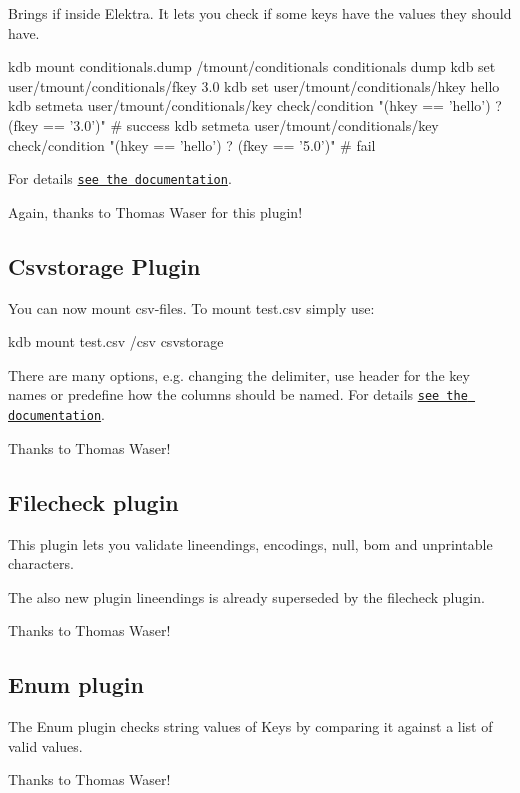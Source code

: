 Brings {\ttfamily if} inside Elektra. It lets you check if some keys have the values they should have. \begin{DoxyVerb}kdb mount conditionals.dump /tmount/conditionals conditionals dump
kdb set user/tmount/conditionals/fkey 3.0
kdb set user/tmount/conditionals/hkey hello
kdb setmeta user/tmount/conditionals/key check/condition "(hkey == 'hello') ? (fkey == '3.0')" # success
kdb setmeta user/tmount/conditionals/key check/condition "(hkey == 'hello') ? (fkey == '5.0')" # fail
\end{DoxyVerb}


For details \href{https://master.libelektra.org/src/plugins/conditionals/}{\tt see the documentation}.

Again, thanks to Thomas Waser for this plugin!

\subsection*{Csvstorage Plugin}

You can now mount csv-\/files. To mount {\ttfamily test.\+csv} simply use\+: \begin{DoxyVerb}kdb mount test.csv /csv csvstorage
\end{DoxyVerb}


There are many options, e.\+g. changing the delimiter, use header for the key names or predefine how the columns should be named. For details \href{https://master.libelektra.org/src/plugins/csvstorage/}{\tt see the documentation}.

Thanks to Thomas Waser!

\subsection*{Filecheck plugin}

This plugin lets you validate lineendings, encodings, null, bom and unprintable characters.

The also new plugin lineendings is already superseded by the filecheck plugin.

Thanks to Thomas Waser!

\subsection*{Enum plugin}

The Enum plugin checks string values of Keys by comparing it against a list of valid values.

Thanks to Thomas Waser!

